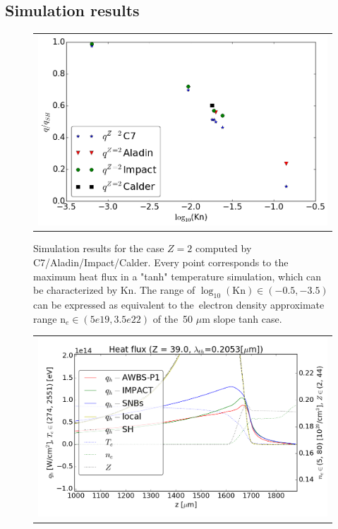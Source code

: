 \subsection{Simulation results}
\label{sec:SimulationResults}

\begin{figure}[tbh]
  \begin{center}
    \begin{tabular}{c}
      \includegraphics[width=1.0\textwidth]{Kn_results.png}
    \end{tabular}
  \caption{  
  Simulation results for the case $Z=2$ computed by C7/Aladin/Impact/Calder.
  Every point corresponds to the maximum heat flux in a "tanh" temperature 
  simulation, which can be characterized by Kn. The range of 
  $\log_{10}(\text{Kn})\in (-0.5, -3.5)$ can be expressed as equivalent 
  to the~electron density approximate range n$_e \in (5e19, 3.5e22)$ of 
  the~50 $\mu$m slope tanh case.}
  \end{center}
  \label{fig:q1s_summary}
\end{figure}

\begin{figure}[tbh]
  \begin{center}
    \begin{tabular}{c}
      \includegraphics[width=1.0\textwidth]{../VFPdata/GD_Hohlraum/fluxes_10ps.png} 
    \end{tabular}
  \caption{
  }
  \end{center}
  \label{fig:Gd_VFP_10ps_heatflux}
\end{figure}
\clearpage

